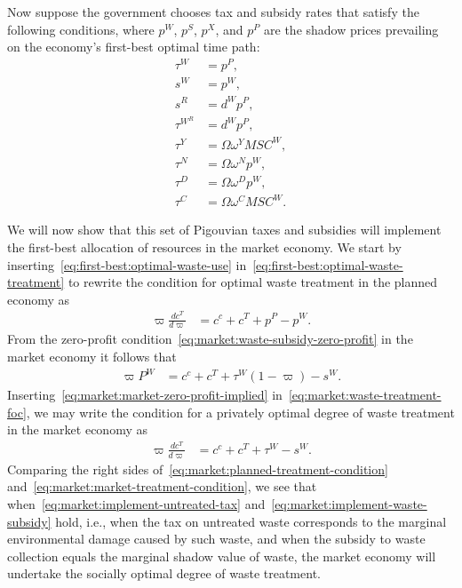 Now suppose the government chooses tax and subsidy rates that satisfy the following conditions, where $p^W$, $p^S$, $p^X$, and $p^P$ are the shadow prices prevailing on the economy's first-best optimal time path:
\begin{align}
\tau^W &= p^P,
\label{eq:market:implement-untreated-tax}
\\
s^W &= p^W,
\label{eq:market:implement-waste-subsidy}
\\
s^R &= d^W p^P,
\label{eq:market:implement-recycling-subsidy}
\\
\tau^{W^R} &= d^W p^P,
\label{eq:market:implement-recycling-input-tax}
\\
\tau^Y &= \Omega\omega^Y MSC^W,
\label{eq:market:implement-output-tax}
\\
\tau^N &= \Omega\omega^N p^W,
\label{eq:market:implement-extraction-tax}
\\
\tau^D &= \Omega\omega^D p^W,
\label{eq:market:implement-discovery-tax}
\\
\tau^C &= \Omega\omega^C MSC^W.
\label{eq:market:implement-consumption-tax}
\end{align}

We will now show that this set of Pigouvian taxes and subsidies will implement the first-best allocation of resources in the market economy. We start by inserting~\eqref{eq:first-best:optimal-waste-use} in~\eqref{eq:first-best:optimal-waste-treatment} to rewrite the condition for optimal waste treatment in the planned economy as
\begin{align}
\varpi\frac{dc^T}{d\varpi} &= c^c + c^T + p^P - p^W.
\label{eq:market:planned-treatment-condition}
\end{align}
From the zero-profit condition~\eqref{eq:market:waste-subsidy-zero-profit} in the market economy it follows that
\begin{align}
\varpi P^W &= c^c + c^T + \tau^W(1-\varpi) - s^W.
\label{eq:market:market-zero-profit-implied}
\end{align}
Inserting~\eqref{eq:market:market-zero-profit-implied} in~\eqref{eq:market:waste-treatment-foc}, we may write the condition for a privately optimal degree of waste treatment in the market economy as
\begin{align}
\varpi\frac{dc^T}{d\varpi} &= c^c + c^T + \tau^W - s^W.
\label{eq:market:market-treatment-condition}
\end{align}
Comparing the right sides of~\eqref{eq:market:planned-treatment-condition} and~\eqref{eq:market:market-treatment-condition}, we see that when~\eqref{eq:market:implement-untreated-tax} and~\eqref{eq:market:implement-waste-subsidy} hold, i.e., when the tax on untreated waste corresponds to the marginal environmental damage caused by such waste, and when the subsidy to waste collection equals the marginal shadow value of waste, the market economy will undertake the socially optimal degree of waste treatment.

